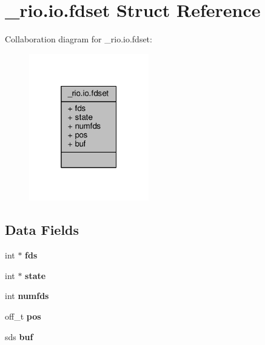 \hypertarget{struct__rio_8io_8fdset}{}\section{\+\_\+rio.\+io.\+fdset Struct Reference}
\label{struct__rio_8io_8fdset}


Collaboration diagram for \+\_\+rio.\+io.\+fdset\+:\nopagebreak
\begin{figure}[H]
\begin{center}
\leavevmode
\includegraphics[width=148pt]{struct__rio_8io_8fdset__coll__graph}
\end{center}
\end{figure}
\subsection*{Data Fields}
\begin{DoxyCompactItemize}
\item 
\mbox{\label{struct__rio_8io_8fdset_a838ece1033bf7c7468e873e79ba2a3ec}} 
int $\ast$ {\bfseries fds}
\item 
\mbox{\label{struct__rio_8io_8fdset_a9ed39e2ea931586b6a985a6942ef573e}} 
int $\ast$ {\bfseries state}
\item 
\mbox{\label{struct__rio_8io_8fdset_a7b140b149c75a21ccb7ba8f6fe4dd7fc}} 
int {\bfseries numfds}
\item 
\mbox{\label{struct__rio_8io_8fdset_a5e0bdcbddccca4d66d74ba8c1cee1a68}} 
off\+\_\+t {\bfseries pos}
\item 
\mbox{\label{struct__rio_8io_8fdset_acb7e52b21171fb9a53b498202607f0bd}} 
sds {\bfseries buf}
\end{DoxyCompactItemize}


